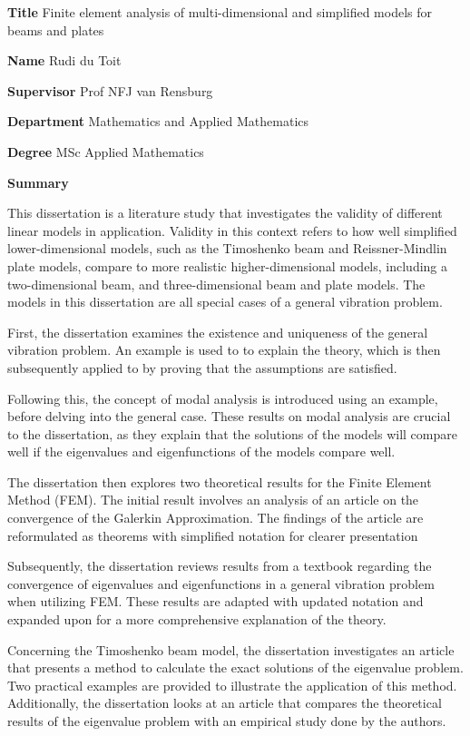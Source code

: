 \documentclass[main.tex]{subfiles}
\begin{document}
\textbf{Title} Finite element analysis of multi-dimensional and simplified models for beams and plates

\textbf{Name} Rudi du Toit

\textbf{Supervisor} Prof NFJ van Rensburg

\textbf{Department} Mathematics and Applied Mathematics

\textbf{Degree} MSc Applied Mathematics

\begin{center}
	\large \textbf{Summary}
\end{center}

This dissertation is a literature study that investigates the validity of different linear models in application. Validity in this context refers to how well simplified lower-dimensional models, such as the Timoshenko beam and Reissner-Mindlin plate models, compare to more realistic higher-dimensional models, including a two-dimensional beam, and three-dimensional beam and plate models. The models in this dissertation are all special cases of a general vibration problem. 

First, the dissertation examines the existence and uniqueness of the general vibration problem. An example is used to to explain the theory, which is then subsequently applied to by proving that the assumptions are satisfied. 

Following this, the concept of modal analysis is introduced using an example, before delving into the general case. These results on modal analysis are crucial to the dissertation, as they explain that the solutions of the models will compare well if the eigenvalues and eigenfunctions of the models compare well.

The dissertation then explores two theoretical results for the Finite Element Method (FEM). The initial result involves an analysis of an article on the convergence of the Galerkin Approximation. The findings of the article are reformulated as theorems with simplified notation for clearer presentation

Subsequently, the dissertation reviews results from a textbook regarding the convergence of eigenvalues and eigenfunctions in a general vibration problem when utilizing FEM. These results are adapted with updated notation and expanded upon for a more comprehensive explanation of the theory.

Concerning the Timoshenko beam model, the dissertation investigates an article that presents a method to calculate the exact solutions of the eigenvalue problem. Two practical examples are provided to illustrate the application of this method. Additionally, the dissertation looks at an article that compares the theoretical results of the eigenvalue problem with an empirical study done by the authors.
\end{document}

